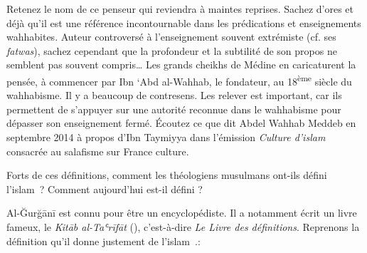 Retenez le nom de ce penseur qui reviendra à maintes reprises. Sachez
d'ores et déjà qu'il est une référence incontournable dans les
prédications et enseignements wahhabites. Auteur controversé à
l'enseignement souvent extrémiste (cf. ses \emph{fatwas}), sachez
cependant que la profondeur et la subtilité de son propos ne semblent
pas souvent compris\ldots{} Les grands cheikhs de Médine en caricaturent
la pensée, à commencer par Ibn `Abd al-Wahhab, le fondateur, au
18\textsuperscript{ème} siècle du wahhabisme. Il y a beaucoup de
contresens. Les relever est important, car ils permettent de s'appuyer
sur une autorité reconnue dans le wahhabisme pour dépasser son
enseignement fermé.
 Écoutez ce que dit Abdel Wahhab Meddeb en septembre
  2014 à propos d'Ibn Taymiyya dans l'émission \emph{Culture d'islam}
  consacrée au salafisme sur France culture.


Forts de ces définitions, comment les théologiens musulmans ont-ils
défini l'islam~? Comment aujourd'hui est-il défini ?



Al-Ğurğānī est connu pour être un encyclopédiste. Il a notamment écrit
un livre fameux, le \emph{Kitāb al-Taʿrīfāt} (),
c'est-à-dire \emph{Le Livre des définitions}. Reprenons la définition
qu'il donne justement de l'islam~.:

